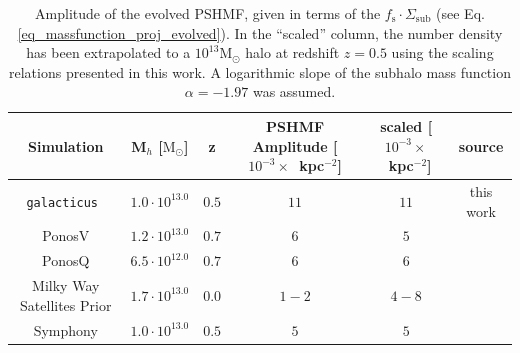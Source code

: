 \documentclass[%
 reprint,
 amsmath,
 amssymb,
 aps,
prd,
twocolumn,
superscriptaddress,
preprintnumbers,
floatfix,
nofootinbib
]{revtex4-2}
\def\gal{{\tt galacticus}~}
\newcommand{\refeq}[1]{Eq. \ref{#1}}
\begin{document}
\begin{table}
    \centering
    \begin{tabular}{cccccc}
        \hline
         Simulation & M$_{h}$ [$\mathrm{M}_{\odot}$] & z & PSHMF Amplitude [$10^{-3}\times$~kpc$^{-2}$] & scaled [$10^{-3}\times$~kpc$^{-2}$]& source \\
         \hline
         \gal & $1.0 \cdot 10^{13.0}$ & $0.5$ & $11$ & $11$ &this work \\
         PonosV & $1.2 \cdot 10^{13.0}$ & $0.7$ & $6$ & $5$ &\cite{2016ApJ...824..144F} \\
         PonosQ & $6.5 \cdot 10^{12.0}$ & $0.7$ & $6$ & $6$  &\cite{2016ApJ...824..144F} \\
         Milky Way Satellites Prior & $1.7 \cdot 10^{13.0}$ & $0.0$ & $1-2$  & $4-8$  & \cite{nadler2021dark} \\
         Symphony & $1.0 \cdot 10^{13.0}$ & $0.5$ & $5$ & $5$  &\cite{nadler2023symphony} \\
         \hline
    \end{tabular}
    \caption{
        Amplitude of the evolved PSHMF, given in terms of the $f_{\mathrm{s}} \cdot \Sigma_{\mathrm{sub}}$ (see \refeq{eq_massfunction_proj_evolved}).
        In the ``scaled'' column, the number density has been extrapolated to a $10^{13} \mathrm{M}_{\odot}$ halo at redshift $z=0.5$ using the scaling relations presented in this work. 
        A logarithmic slope of the subhalo mass function $\alpha = -1.97$ was assumed.
    }
    \label{tab_fits_external}
\end{table}
\end{document}
